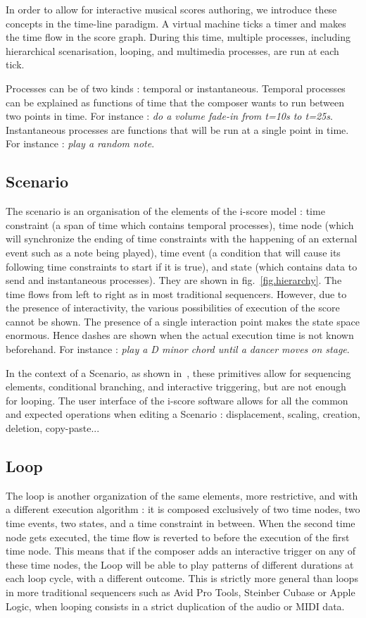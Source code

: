 \documentclass{article}
\begin{document}
In order to allow for interactive musical scores authoring, we introduce these concepts in the time-line paradigm.
A virtual machine ticks a timer and makes the time flow in the score graph. 
During this time, multiple processes, including hierarchical scenarisation, looping, and multimedia processes, are 
run at each tick. 

Processes can be of two kinds : temporal or instantaneous.
Temporal processes can be explained as functions of time that the composer wants to run between 
two points in time. 
For instance : \emph{do a volume fade-in from t=10s to t=25s}.~\\
Instantaneous processes are functions that will be run at a single point in time.
For instance : \emph{play a random note}.

\subsection{Scenario}
The scenario is an organisation of the elements of the i-score model : time constraint (a span of time which contains temporal processes), time node (which will synchronize the ending of time constraints with the happening of an external event such as a note being played), time event (a condition that will cause its following time constraints to start if it is true), and state (which contains data to send and instantaneous processes).
They are shown in fig.~\ref{fig.hierarchy}. 
The time flows from left to right as in most traditional sequencers. 
However, due to the presence of interactivity, the various possibilities of execution of the score cannot be shown. 
The presence of a single interaction point makes the state space enormous.
Hence dashes are shown when the actual execution time is not known beforehand. 
For instance : \emph{play a D minor chord until a dancer moves on stage}.

In the context of a Scenario, as shown in~\cite{celerier2015ossia}, these primitives allow for sequencing elements, conditional branching, and interactive triggering, but are not enough for looping.
The user interface of the i-score software allows for all the common and expected operations when editing a Scenario : displacement, scaling, creation, deletion, copy-paste...

\subsection{Loop}
The loop is another organization of the same elements, more restrictive, and with a different execution algorithm : it is 
composed exclusively of two time nodes, two time events, two states, and a time constraint in between.
When the second time node gets executed, the time flow is reverted to before the execution of the first time node.
This means that if the composer adds an interactive trigger on any of these time nodes, the Loop will be able to play patterns of different durations at each loop cycle, with a different outcome.
This is strictly more general than loops in more traditional sequencers such as Avid Pro Tools, Steinber Cubase or Apple Logic, when looping consists in a strict duplication of the audio or MIDI data.
\end{document}
